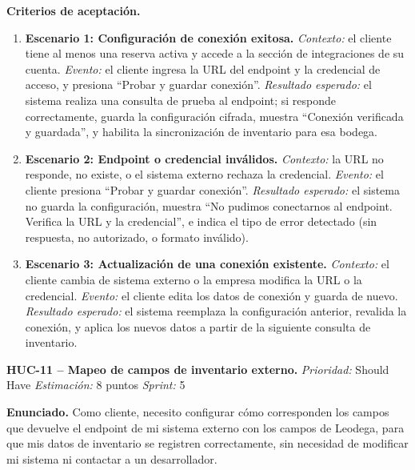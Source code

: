 \textbf{Criterios de aceptación.}
\begin{enumerate}
\item \textbf{Escenario 1: Configuración de conexión exitosa.} \textit{Contexto:} el cliente tiene al menos una reserva activa y accede a la sección de integraciones de su cuenta. \textit{Evento:} el cliente ingresa la URL del endpoint y la credencial de acceso, y presiona ``Probar y guardar conexión''. \textit{Resultado esperado:} el sistema realiza una consulta de prueba al endpoint; si responde correctamente, guarda la configuración cifrada, muestra ``Conexión verificada y guardada'', y habilita la sincronización de inventario para esa bodega.
\item \textbf{Escenario 2: Endpoint o credencial inválidos.} \textit{Contexto:} la URL no responde, no existe, o el sistema externo rechaza la credencial. \textit{Evento:} el cliente presiona ``Probar y guardar conexión''. \textit{Resultado esperado:} el sistema no guarda la configuración, muestra ``No pudimos conectarnos al endpoint. Verifica la URL y la credencial'', e indica el tipo de error detectado (sin respuesta, no autorizado, o formato inválido).
\item \textbf{Escenario 3: Actualización de una conexión existente.} \textit{Contexto:} el cliente cambia de sistema externo o la empresa modifica la URL o la credencial. \textit{Evento:} el cliente edita los datos de conexión y guarda de nuevo. \textit{Resultado esperado:} el sistema reemplaza la configuración anterior, revalida la conexión, y aplica los nuevos datos a partir de la siguiente consulta de inventario.
\end{enumerate}

\textbf{HUC-11 -- Mapeo de campos de inventario externo.} \label{req:HUC-11}
\textit{Prioridad:} Should Have \quad \textit{Estimación:} 8 puntos \quad \textit{Sprint:} 5

\textbf{Enunciado.} Como cliente, necesito configurar cómo corresponden los campos que devuelve el endpoint de mi sistema externo con los campos de Leodega, para que mis datos de inventario se registren correctamente, sin necesidad de modificar mi sistema ni contactar a un desarrollador.

